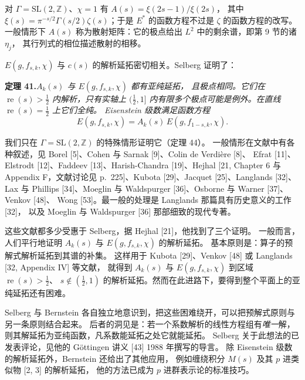 \begin{annote}
对 $\Gamma=\mathrm{SL}(2,\mathbb{Z})$、$\chi=1$ 有 $A(s)=\xi(2s-1)/\xi(2s)$，
其中 $\xi(s)=\pi^{-s/2}\Gamma(s/2)\zeta(s)$；于是 $E^{*}$ 的函数方程不过是 $\zeta$ 的函数方程的改写。
一般情形下 $A(s)$ 称为散射矩阵：它的极点给出 $L^{2}$ 中的剩余谱，即第 9 节的诸 $\eta_{j}$，
其行列式的相位描述散射的相移。
\par\vspace{0.15em}{\raggedleft 【来源：Iwaniec, 1995, Ch.~3 与 Ch.~13；Hejhal, Vol.~2, Ch.~6（A）】\par}
\end{annote}

$E(g,f_{s,k},\chi)$ 与 $c(s)$ 的解析延拓密切相关。Selberg 证明了：

\par\medskip\noindent\textbf{定理 41.}\quad\emph{$A_{k}(s)$ 与 $E(g,f_{s,k},\chi)$ 都有亚纯延拓，
且极点相同。它们在 $\operatorname{re}(s)>\tfrac12$ 内解析，只有实轴上 $(\tfrac12,1]$
内有限多个极点可能是例外。在直线 $\operatorname{re}(s)=\tfrac12$ 上它们全纯。
Eisenstein 级数满足函数方程}
\[
E(g,f_{s,k},\chi)=A_{k}(s)\,E(g,f_{1-s,k},\chi).
\]

\smallskip
我们只在 $\Gamma=\mathrm{SL}(2,\mathbb{Z})$ 的特殊情形证明它（定理 44）。
一般情形在文献中有各种叙述，见 Borel [5]、Cohen 与 Sarnak [9]、Colin de Verdi\`ere [8]、
Efrat [11]、Elstrodt [12]、Faddeev [13]、Harish-Chandra [19]、Hejhal [21, Chapter 6 与
Appendix F，文献讨论见 p.\ 225]、Kubota [29]、Jacquet [25]、Langlands [32]、
Lax 与 Phillips [34]、Moeglin 与 Waldspurger [36]、Osborne 与 Warner [37]、Venkov [48]、
Wong [53]。最一般的处理是 Langlands 那篇具有历史意义的工作 [32]，
以及 Moeglin 与 Waldspurger [36] 那部细致的现代专著。

这些文献都多少受惠于 Selberg，据 Hejhal [21]，他找到了三个证明。
一般而言，人们平行地证明 $A_{k}(s)$ 与 $E(g,f_{s,k},\chi)$ 的解析延拓。
基本原则是：算子的预解式解析延拓到其谱的补集。
这样用于 Kubota [29]、Venkov [48] 或 Langlands [32, Appendix IV] 等文献，
就得到 $A_{k}(s)$ 与 $E(g,f_{s,k},\chi)$ 到区域 $\operatorname{re}(s)>\tfrac12$、
$s\notin(\tfrac12,1)$ 的解析延拓。然而在此进路下，要得到整个平面上的亚纯延拓还有困难。

Selberg 与 Bernstein 各自独立地意识到，把这些困难绕开，可以把预解式原则与另一条原则结合起来。
后者的洞见是：若一个系数解析的线性方程组有\emph{唯一}解，
则其解延拓为亚纯函数，凡系数能延拓之处它就能延拓。
Selberg 关于此想法的已发表评论，见他的 G\"ottingen 讲义 [43] 1988 年撰写的导言。
除 Eisenstein 级数的解析延拓外，Bernstein 还给出了其他应用，
例如缠绕积分 $M(s)$ 及其 $p$ 进类似物 [2, 3] 的解析延拓，
他的方法已成为 $p$ 进群表示论的标准技巧。

